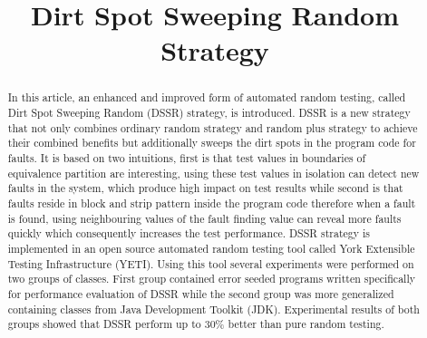 \documentclass[10pt, conference, compsocconf]{IEEEtran}
\begin{document}
%
\title{Dirt Spot Sweeping Random Strategy}



\author{
\and
{}
}


\maketitle


\begin{abstract}

In this article, an enhanced and improved form of automated random testing, called Dirt Spot Sweeping Random (DSSR) strategy, is introduced. DSSR is a new strategy that not only combines ordinary random strategy and random plus strategy to achieve their combined benefits but additionally sweeps the dirt spots in the program code for faults. It is based on two intuitions, first is that test values in boundaries of equivalence partition are interesting, using these test values in isolation can detect new faults in the system, which produce high impact on test results while second is that faults reside in block and strip pattern inside the program code therefore when a fault is found, using neighbouring values of the fault finding value can reveal more faults quickly which consequently increases the test performance. DSSR strategy is implemented in an open source automated random testing tool called York Extensible Testing Infrastructure (YETI). Using this tool several experiments were performed on two groups of classes. First group contained error seeded programs written specifically for performance evaluation of DSSR while the second group was more generalized containing classes from Java Development Toolkit (JDK). Experimental results of both groups showed that DSSR perform up to 30\% better than pure random testing.

\end{abstract}
\end{document}
